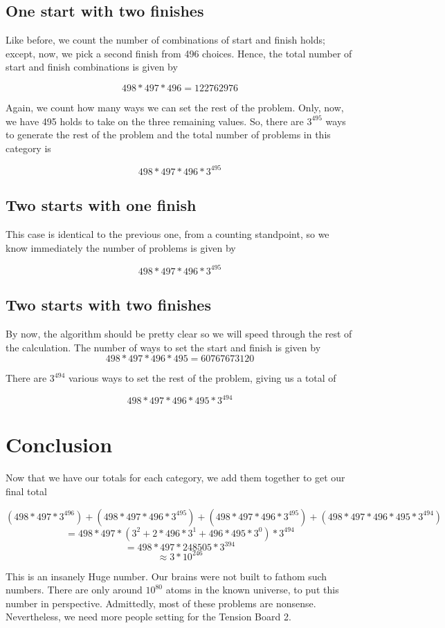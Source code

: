 \documentclass{article}
\begin{document}
\subsection{One start with two finishes}

Like before, we count the number of combinations of start and finish holds; except, now, we pick a second finish from 496 choices. Hence, the total number of start and finish combinations is given by

\[498 * 497 * 496 = 122762976\]

Again, we count how many ways we can set the rest of the problem. Only, now, we have 495 holds to take on the three remaining values. So, there are $3^{495}$ ways to generate the rest of the problem and the total number of problems in this category is

\[498 * 497 * 496 * 3 ^ {495}\]

\subsection{Two starts with one finish}

This case is identical to the previous one, from a counting standpoint, so we know immediately the number of problems is given by

\[498 * 497 * 496 * 3 ^ {495}\]

\subsection{Two starts with two finishes}

By now, the algorithm should be pretty clear so we will speed through the rest of the calculation.
The number of ways to set the start and finish is given by
\[498 * 497 * 496 * 495 = 60767673120\]

There are $3 ^ {494}$ various ways to set the rest of the problem, giving us a total of

\[498 * 497 * 496 * 495 * 3 ^ {494}\]

\section{Conclusion}
Now that we have our totals for each category, we add them together to get our final total

\[(498 * 497 * 3 ^ {496}) + (498 * 497 * 496 * 3 ^ {495}) + (498 * 497 * 496 * 3 ^ {495}) + (498 * 497 * 496 * 495 * 3 ^ {494})\]
\[= 498 * 497  * (3 ^ {2} + 2 * 496 * 3 ^ {1} + 496 * 495 * 3 ^ {0}) * 3 ^ {494}\]
\[= 498 * 497 * 248505 * 3 ^ {394}\]
\[\approx 3 * 10 ^ {246}\]

This is an insanely Huge number. Our brains were not built to fathom such numbers. There are only around $10^{80}$ atoms in the known universe, to put this number in perspective. Admittedly, most of these problems are nonsense. Nevertheless, we need more people setting for the Tension Board 2.
\end{document}
